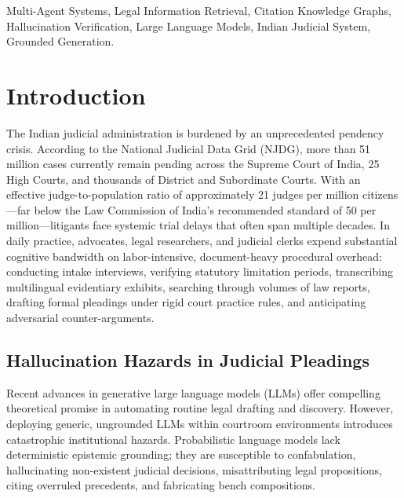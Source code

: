 \documentclass[conference]{IEEEtran}
\begin{document}
\begin{IEEEkeywords}
Multi-Agent Systems, Legal Information Retrieval, Citation Knowledge Graphs, Hallucination Verification, Large Language Models, Indian Judicial System, Grounded Generation.
\end{IEEEkeywords}

\section{Introduction}
The Indian judicial administration is burdened by an unprecedented pendency crisis. According to the National Judicial Data Grid (NJDG), more than 51 million cases currently remain pending across the Supreme Court of India, 25 High Courts, and thousands of District and Subordinate Courts. With an effective judge-to-population ratio of approximately 21 judges per million citizens—far below the Law Commission of India's recommended standard of 50 per million—litigants face systemic trial delays that often span multiple decades. In daily practice, advocates, legal researchers, and judicial clerks expend substantial cognitive bandwidth on labor-intensive, document-heavy procedural overhead: conducting intake interviews, verifying statutory limitation periods, transcribing multilingual evidentiary exhibits, searching through volumes of law reports, drafting formal pleadings under rigid court practice rules, and anticipating adversarial counter-arguments.

\subsection{Hallucination Hazards in Judicial Pleadings}
Recent advances in generative large language models (LLMs) offer compelling theoretical promise in automating routine legal drafting and discovery. However, deploying generic, ungrounded LLMs within courtroom environments introduces catastrophic institutional hazards. Probabilistic language models lack deterministic epistemic grounding; they are susceptible to confabulation, hallucinating non-existent judicial decisions, misattributing legal propositions, citing overruled precedents, and fabricating bench compositions. 
\end{document}

